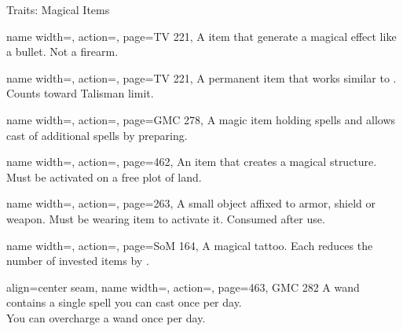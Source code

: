 \begin{PageBack}
\begin{Tables}{\backTableHeight}
\begin{Table}{Traits: Magical Items}
\begin{entry}{}{%
                name width=\conditionLength,%
                action=\Spellgun,
                page=TV 221,
            }
                A item that generate a magical effect like a bullet. Not a firearm.
            \end{entry}
            \begin{entry}{}{%
                name width=\conditionLength,%
                action=\Spellheart,
                page=TV 221,
            }
                A permanent item that works similar to .
                Counts toward Talisman limit. \hfill
            \end{entry}
            \begin{entry}{}{%
                name width=\conditionLength,%
                action=\Staff,
                page=GMC 278,
            }
                A magic item holding spells and allows cast of additional spells by preparing.
            \end{entry}
            \begin{entry}{}{%
                name width=\conditionLength,%
                action=\Structure,
                page=462,
            }
                An item that creates a magical structure. Must be activated on a free plot of land.
            \end{entry}
            \begin{entry}{}{%
                name width=\conditionLength,%
                action=\Talisman,
                page=263,
            }
                A small object affixed to armor, shield or weapon.
                Must be wearing item to activate it.
                Consumed after use.
            \end{entry}
            \begin{entry}{}{%
                name width=\conditionLength,%
                action=\Tattoo,
                page=SoM 164,
            }
                A magical tattoo.
                Each reduces the number of invested items by .
            \end{entry}
            \begin{entry}{}{%
                align=center seam,
                name width=\conditionLength,%
                action=\Wand,
                page={463, GMC 282}
            }
                A wand contains a single spell you can cast once per day. \\
                You can overcharge a wand once per day.
                \Flat[][val=5]  \hfill
            \end{entry}
        \end{Table}
    \end{Tables}%
\end{PageBack}